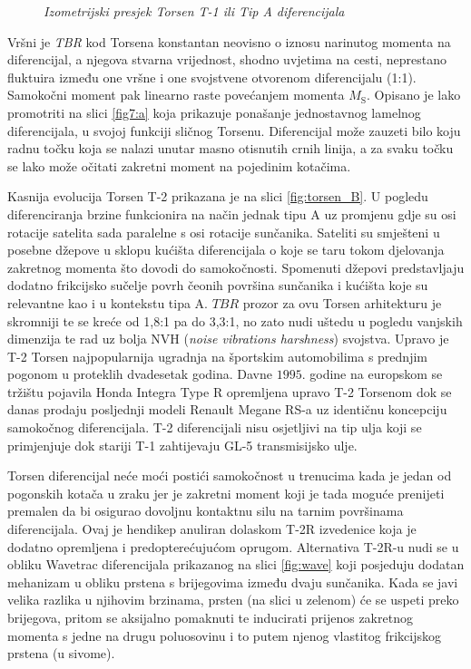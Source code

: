 \documentclass[11pt]{article}
\numberwithin{equation}{section}%
\begin{document}
\begin{figure}
 \centering
 \def\svgwidth{9cm}
 
 \caption{\textit{Izometrijski presjek Torsen T-1 ili Tip A diferencijala} \cite{genta2008automotive}}
 \label{fig:torsen}
\end{figure} 

Vršni je \textit{TBR} kod Torsena konstantan neovisno o iznosu narinutog momenta na diferencijal, a njegova stvarna vrijednost, shodno uvjetima na cesti, neprestano fluktuira između one vršne i one svojstvene otvorenom diferencijalu (1:1). Samokočni moment pak linearno raste povećanjem momenta $M_\text{S}$. Opisano je lako promotriti na slici \ref{fig7:a} koja prikazuje ponašanje jednostavnog lamelnog diferencijala, u svojoj funkciji sličnog Torsenu. Diferencijal može zauzeti bilo koju radnu točku koja se nalazi unutar masno otisnutih crnih linija, a za svaku točku se lako može očitati zakretni moment na pojedinim kotačima. 

Kasnija evolucija Torsen T-2 prikazana je na slici \ref{fig:torsen_B}. U pogledu diferenciranja brzine funkcionira na način jednak tipu A uz promjenu gdje su osi rotacije satelita sada paralelne s osi rotacije sunčanika. Sateliti su smješteni u posebne džepove u sklopu kućišta diferencijala o koje se taru tokom djelovanja zakretnog momenta što dovodi do samokočnosti. Spomenuti džepovi predstavljaju dodatno frikcijsko sučelje povrh čeonih površina sunčanika i kućišta koje su relevantne kao i u kontekstu tipa A. $TBR$ prozor za ovu Torsen arhitekturu je skromniji te se kreće od 1,8:1 pa do 3,3:1, no zato nudi uštedu u pogledu vanjskih dimenzija te rad uz bolja NVH (\textit{noise vibrations harshness}) svojstva. Upravo je T-2 Torsen najpopularnija ugradnja na športskim automobilima s prednjim pogonom u proteklih dvadesetak godina. Davne $1995.$ godine na europskom se tržištu pojavila Honda Integra Type R opremljena upravo T-2 Torsenom dok se danas prodaju posljednji modeli Renault Megane RS-a uz identičnu koncepciju samokočnog diferencijala. T-2 diferencijali nisu osjetljivi na tip ulja koji se primjenjuje dok stariji T-1 zahtijevaju GL-5 transmisijsko ulje.

Torsen diferencijal neće moći postići samokočnost u trenucima kada je jedan od pogonskih kotača u zraku jer je zakretni moment koji je tada moguće prenijeti premalen da bi osigurao dovoljnu kontaktnu silu na tarnim površinama diferencijala. Ovaj je hendikep anuliran dolaskom T-2R izvedenice koja je dodatno opremljena i predopterećujućom oprugom. Alternativa T-2R-u nudi se u obliku Wavetrac diferencijala prikazanog na slici \ref{fig:wave} koji posjeduju dodatan mehanizam u obliku prstena s brijegovima između dvaju sunčanika. Kada se javi velika razlika u njihovim brzinama, prsten (na slici u zelenom) će se uspeti preko brijegova, pritom se aksijalno pomaknuti te inducirati prijenos zakretnog momenta s jedne na drugu poluosovinu i to putem njenog vlastitog frikcijskog prstena (u sivome).
\end{document}
